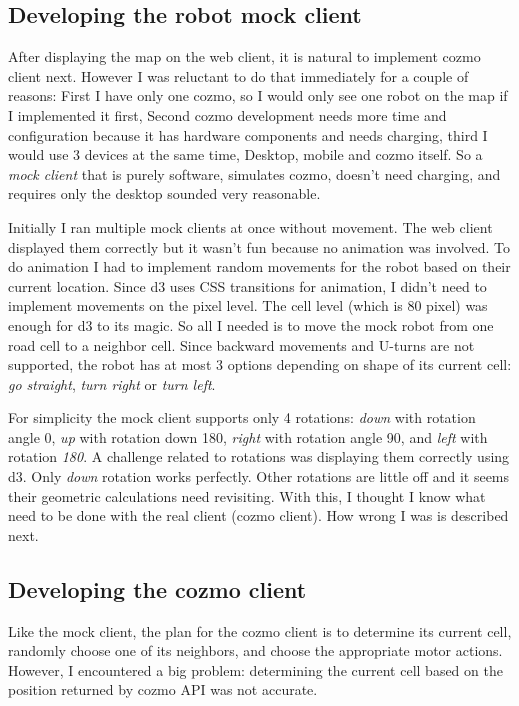 \documentclass[12pt,a4paper]{article}
\begin{document}
\subsection{Developing the robot mock client}

After displaying the map on the web client, it is natural to implement cozmo client next. However I was reluctant to do that immediately for a couple of reasons: First I have only one cozmo, so I would only see one robot on the map if I implemented it first, Second cozmo development needs more time and configuration because it has hardware components and needs charging, third I would use 3 devices at the same time, Desktop, mobile and cozmo itself. So a \textit{mock client} that is purely software, simulates cozmo, doesn't need charging,  and requires only the desktop sounded very reasonable. 

Initially I ran multiple mock clients at once without movement. The web client displayed them correctly but it wasn't fun because no animation was involved. To do animation I had to implement random movements for the robot based on their current location. Since d3 uses CSS transitions for animation, I didn't need to implement movements on the pixel level. The cell level (which is 80 pixel) was enough for d3 to its magic. So all I needed is to move the mock robot from one road cell to a neighbor cell. Since backward movements and U-turns are not supported, the robot has at most 3 options depending on shape of its current cell: \textit{go straight}, \textit{turn right} or \textit{turn left}. 

For simplicity the mock client supports only 4 rotations: \textit{down} with rotation angle 0, \textit{up} with rotation down 180, \textit{right} with rotation angle 90, and \textit{left} with rotation \textit{180}. A challenge related to rotations was displaying them correctly using d3. Only \textit{down} rotation works perfectly. Other rotations are little off and it seems their geometric calculations need revisiting. With this, I thought I know what need to be done with the real client (cozmo client). How wrong I was is described next. 

\subsection{Developing the cozmo client}

Like the mock client, the plan for the cozmo client is to determine its current cell, randomly choose one of its neighbors, and choose the appropriate motor actions. However, I encountered a big problem: determining the current cell based on the position returned by cozmo  API was not accurate. 
\end{document}
